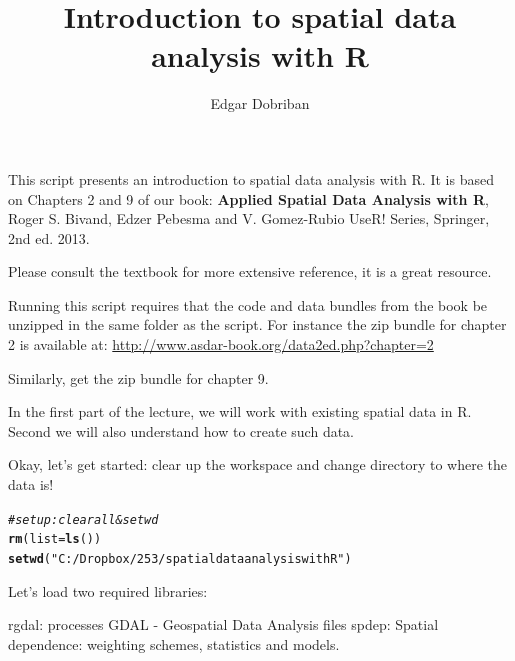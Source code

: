 \documentclass{article}\usepackage[]{graphicx}\usepackage[]{color}
\makeatletter
\newcommand{\hlstr}[1]{\textcolor[rgb]{0.192,0.494,0.8}{#1}}%
\newcommand{\hlcom}[1]{\textcolor[rgb]{0.678,0.584,0.686}{\textit{#1}}}%
\newcommand{\hlstd}[1]{\textcolor[rgb]{0.345,0.345,0.345}{#1}}%
\newcommand{\hlkwc}[1]{\textcolor[rgb]{0.333,0.667,0.333}{#1}}%
\newcommand{\hlkwd}[1]{\textcolor[rgb]{0.737,0.353,0.396}{\textbf{#1}}}%
\newenvironment{kframe}{%
 \def\at@end@of@kframe{}%
 \ifinner\ifhmode%
  \def\at@end@of@kframe{\end{minipage}}%
  \begin{minipage}{\columnwidth}%
 \fi\fi%
 \def\FrameCommand##1{\hskip\@totalleftmargin \hskip-\fboxsep
 \colorbox{shadecolor}{##1}\hskip-\fboxsep
     \hskip-\linewidth \hskip-\@totalleftmargin \hskip\columnwidth}%
 \MakeFramed {\advance\hsize-\width
   \@totalleftmargin\z@ \linewidth\hsize
   \@setminipage}}%
 {\par\unskip\endMakeFramed%
 \at@end@of@kframe}
\newenvironment{knitrout}{}{} %
\makeatother
\begin{document}
\title{Introduction to spatial data analysis with R}
\author{Edgar Dobriban}

\maketitle
  This script presents an introduction to spatial data analysis with R. It is based on Chapters 2 and 9 of our book: \textbf{Applied Spatial Data Analysis with R}, Roger S. Bivand, Edzer Pebesma and V. Gomez-Rubio
   UseR! Series, Springer, 2nd ed. 2013.
   
   Please consult the textbook for more extensive reference, it is a great resource.
   
  Running this script requires that the code and data bundles from the book be unzipped in the same folder as the script. For instance the zip bundle for chapter 2 is available at: 
  \url{http://www.asdar-book.org/data2ed.php?chapter=2}

Similarly, get the zip bundle for chapter 9.
 
In the first part of the lecture, we will work with existing spatial data in R. Second we will also understand how to create such data.

Okay, let's get started: clear up the workspace and change directory to where the data is!

\begin{knitrout}
\color{fgcolor}\begin{kframe}
\begin{alltt}
\hlcom{#set up: clear all  & set wd}
\hlkwd{rm}\hlstd{(}\hlkwc{list}\hlstd{=}\hlkwd{ls}\hlstd{())}
\hlkwd{setwd}\hlstd{(}\hlstr{"C:/Dropbox/253/spatial data analysis with R"}\hlstd{)}
\end{alltt}
\end{kframe}
\end{knitrout}

Let's load two required libraries:

rgdal: processes GDAL - Geospatial Data Analysis files
spdep: Spatial dependence: weighting schemes, statistics and models.
\end{document}
